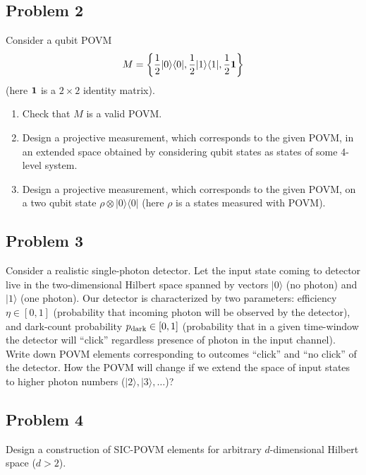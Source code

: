 \documentclass[a4paper,10pt]{article}
\newcommand{\ket}[1]{|#1\rangle}
\newcommand{\bra}[1]{\langle#1|}
\begin{document}
\subsection*{Problem 2}
Consider a qubit POVM
\begin{equation}
	M = \left\{\frac{1}{2}\ket{0}\bra{0}, \frac{1}{2}\ket{1}\bra{1}, \frac{1}{2}{\bf 1}\right\}
\end{equation}
(here ${\bf 1}$ is a $2\times 2$ identity matrix).
\begin{enumerate}
	\item Check that $M$ is a valid POVM.
	\item Design a projective measurement, which corresponds to the given POVM, in an extended space obtained by considering qubit states as states of some 4-level system. 
	\item Design a projective measurement, which corresponds to the given POVM, on a two qubit state $\rho\otimes\ket{0}\bra{0}$ (here $\rho$ is a states measured with POVM).
\end{enumerate}


\subsection*{Problem 3}
Consider a realistic single-photon detector.
Let the input state coming to detector live in the two-dimensional Hilbert space spanned by vectors $\ket{0}$ (no photon) and $\ket{1}$ (one photon).
Our detector is characterized by two parameters: efficiency $\eta\in [0,1]$ (probability that incoming photon will be observed by the detector), and dark-count probability $p_{\rm dark}\in[0,1]$ (probability that in a given time-window the detector will ``click'' regardless presence of photon in the input channel).
Write down POVM elements corresponding to outcomes ``click'' and ``no click'' of the detector.
How the POVM will change if we extend the space of input states to higher photon numbers ($\ket{2}, \ket{3}, \ldots$)?

\subsection*{Problem 4}
Design a construction of SIC-POVM elements for arbitrary $d$-dimensional Hilbert space ($d>2$).
\end{document}
